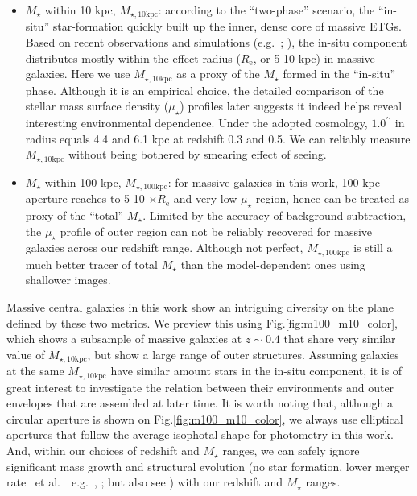 \documentclass{emulateapj}
\def\arcsec{{\prime\prime}}
\def\etal{{\ et al.~}}
\def\mstar{{$M_{\star}$}}
\def\minn{{$M_{\star,10\mathrm{kpc}}$}}
\def\mtot{{$M_{\star,100\mathrm{kpc}}$}}
\def\mden{{$\mu_{\star}$}}
\begin{document}
\begin{CJK*}{UTF8}{gbsn}
    \begin{itemize}
        \item \mstar{} within 10 kpc, \minn{}: according to the ``two-phase'' 
            scenario, the ``in-situ'' star-formation quickly built up the inner, dense 
            core of massive ETGs.  
            Based on recent observations and simulations (e.g.~\citealt{vanDokkum2010}; 
            \citealt{RodriguezGomez2016}), the in-situ 
            component distributes mostly within the effect radius ($R_{\mathrm{e}}$, 
            or 5-10 kpc) in massive galaxies.  
            Here we use \minn{} as a proxy of the \mstar{} formed in the ``in-situ''
            phase.  Although it is an empirical choice, the detailed comparison of 
            the stellar mass surface density (\mden{}) profiles later suggests it indeed 
            helps reveal interesting environmental dependence.  
            Under the adopted cosmology, $1.0^{\arcsec}$ in radius equals 4.4 and 6.1 kpc 
            at redshift 0.3 and 0.5.  
            We can reliably measure \minn{} without being bothered by smearing effect
            of seeing.
        \item \mstar{} within 100 kpc, \mtot{}: for massive galaxies in this work, 
            100 kpc aperture reaches to 5-10 $\times R_{\mathrm{e}}$ and very low 
            \mden{} region, hence can be treated as proxy of the ``total'' \mstar{}. 
            Limited by the accuracy of background subtraction, the \mden{} profile 
            of outer region can not be reliably recovered for massive galaxies across 
            our redshift range. 
            Although not perfect, \mtot{} is still a much better tracer of total 
            \mstar{} than the model-dependent ones using shallower images.
    \end{itemize}
    
    Massive central galaxies in this work show an intriguing diversity on the 
    plane defined by these two metrics.  
    We preview this using Fig.\ref{fig:m100_m10_color}, which shows a subsample of 
    massive galaxies at $z\sim 0.4$ that share very similar value of \minn{}, but show 
    a large range of outer structures. 
    Assuming galaxies at the same \minn{} have similar amount stars in the in-situ 
    component, it is of great interest to investigate the relation between their 
    environments and outer envelopes that are assembled at later time. 
    It is worth noting that, although a circular aperture is shown on 
    Fig.\ref{fig:m100_m10_color}, we always use elliptical apertures that follow the 
    average isophotal shape for photometry in this work.
    And, within our choices of redshift and \mstar{} ranges, we can safely ignore 
    significant mass growth and structural evolution 
    (no star formation, lower merger rate \etal~e.g.\ \citealt{Bellstedt2016},
    \citealt{Inagaki2015}; but also see \citealt{Bai2014}) 
    with our redshift and \mstar{} ranges. 


\end{CJK*}
\end{document}
